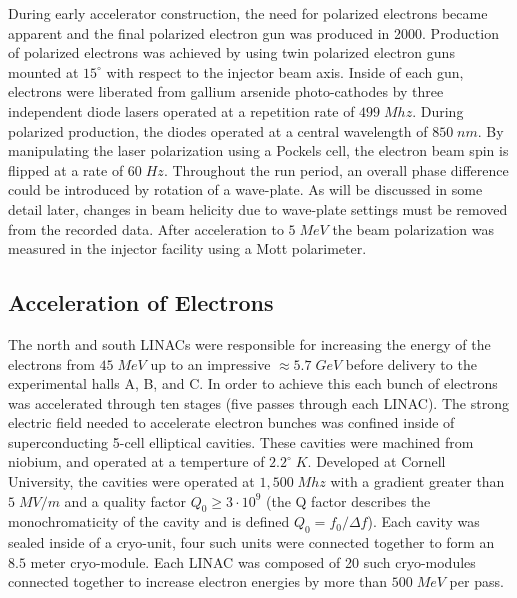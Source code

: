 During early accelerator construction, the need for polarized electrons became apparent and the final polarized electron gun was produced in 2000.  Production of polarized electrons was achieved by using twin polarized electron guns mounted at $15^\circ$ with respect to the injector beam axis.  Inside of each gun, electrons were liberated from gallium arsenide photo-cathodes by three independent diode lasers operated at a repetition rate of $499 \; Mhz$.  During polarized production, the diodes operated at a central wavelength of $850 \; nm$.  By manipulating the laser polarization using a Pockels cell, the electron  beam spin is flipped at a rate of $60 \; Hz$.  Throughout the run period, an overall phase difference could be introduced by rotation of a wave-plate.  As will be discussed in some detail later, changes in beam helicity due to wave-plate settings must be removed from the recorded data.  After acceleration to $5 \; MeV$ the beam polarization was measured in the injector facility using a Mott polarimeter. \\


\subsection{Acceleration of Electrons}    
The north and south LINACs were responsible for increasing the energy of the electrons from $45 \; MeV$ up to an impressive $\approx 5.7 \; GeV$ before delivery to the experimental halls A, B, and C.  In order to achieve this each bunch of electrons was accelerated through ten stages (five passes through each LINAC).  The strong electric field needed to accelerate electron bunches was confined inside of superconducting 5-cell elliptical cavities.  These cavities were machined from niobium, and operated at a temperture of $2.2^\circ \; K$.  Developed at Cornell University, the cavities were operated at $1,500 \; Mhz$ with a gradient greater than $5 \; MV/m$ and a quality factor $Q_0 \geq 3 \cdot 10^9$ (the Q factor describes the monochromaticity of the cavity and is defined $Q_0 = f_0/\Delta f$).  Each cavity was sealed inside of a cryo-unit, four such units were connected together to form an $8.5$ meter cryo-module.  Each LINAC was composed of 20 such cryo-modules connected together to increase electron energies by more than $500 \; MeV$ per pass.\\

